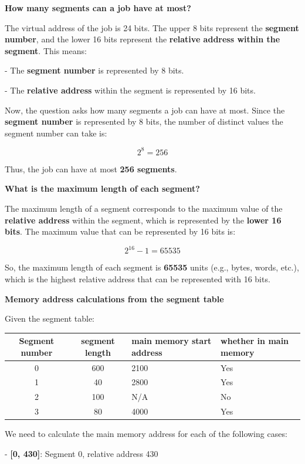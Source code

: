 \documentclass[a4paper]{book}
\begin{document}
\textbf{How many segments can a job have at most?}

The virtual address of the job is 24 bits. The upper 8 bits represent the \textbf{segment number}, and the lower 16 bits represent the \textbf{relative address within the segment}. This means:

- The \textbf{segment number} is represented by 8 bits.

- The \textbf{relative address} within the segment is represented by 16 bits.

Now, the question asks how many segments a job can have at most. Since the \textbf{segment number} is represented by 8 bits, the number of distinct values the segment number can take is:

\[
2^8 = 256
\]

Thus, the job can have at most \textbf{256 segments}.

\textbf{What is the maximum length of each segment?}

The maximum length of a segment corresponds to the maximum value of the \textbf{relative address} within the segment, which is represented by the \textbf{lower 16 bits}. The maximum value that can be represented by 16 bits is:

\[
2^{16} - 1 = 65535
\]

So, the maximum length of each segment is \textbf{65535} units (e.g., bytes, words, etc.), which is the highest relative address that can be represented with 16 bits.

\textbf{Memory address calculations from the segment table}

Given the segment table:

\vspace{0.5cm}
\begin{tabular}{|c|c|p{3cm}|p{3cm}|}
    \hline
    Segment number & segment length & main memory start address & whether in main memory \\ \hline
    0   & 600   & 2100 & Yes  \\  \hline
    1   & 40    & 2800 & Yes  \\  \hline
	2   & 100   & N/A  & No   \\  \hline
	3   & 80    & 4000 & Yes  \\  \hline
\end{tabular}

We need to calculate the main memory address for each of the following cases:

- \textbf{[0, 430]}: Segment 0, relative address 430
\end{document}
